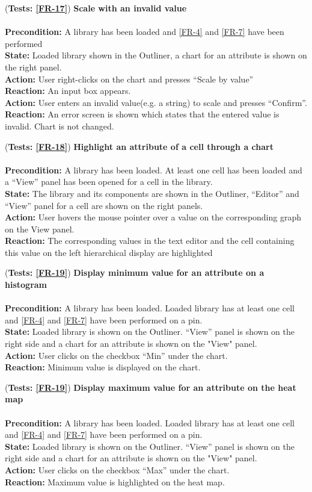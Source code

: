 \documentclass[10pt,a4paper]{report}
\newcommand{\precondition}[1]{
    \textbf{Precondition: } #1 \leavevmode \\
}
\newcommand{\action}[1]{
    \textbf{Action: } #1 \leavevmode \\
}
\newcommand{\state}[1]{
    \textbf{State: } #1 \leavevmode \\
}
\newcommand{\reaction}[1]{
    \textbf{Reaction: } #1 \leavevmode \\
}
\newcommand{\GTCDescription}[2]{
    (\textbf{Tests: #1}) \textbf{#2} \leavevmode \\
}
\begin{document}
\begin{GTC}
     \item \GTCDescription{\ref{FR-17}}
     {Scale with an invalid value} \leavevmode \\ 
        \precondition{A library has been loaded and \ref{FR-4} and \ref{FR-7} have been performed }
        \state{Loaded library shown in the Outliner, a chart for an attribute is shown on the right panel.}
        \action{User right-clicks on the chart and presses “Scale by value”}
        \reaction{An input box appears.}
        \action{User enters an invalid value(e.g. a string) to scale and presses “Confirm”.}
        \reaction{An error screen is shown which states that the entered value is invalid. Chart is not changed.}\label{GTC-41}
    
    \item \GTCDescription{\ref{FR-18}}
    {Highlight an attribute of a cell through a chart} \leavevmode \\ 
        \precondition{A library has been loaded. At least one cell has been loaded and a “View” panel has been opened for a cell in the library.}
        \state{The library and its components are shown in the Outliner, “Editor” and “View” panel for a cell are shown on the right panels.}
        \action{User hovers the mouse pointer over a value on the corresponding graph on the View panel.}
        \reaction{The corresponding values in the text editor and the cell containing this value on the left hierarchical display are highlighted}\label{GTC-42}
    
     \item \GTCDescription{\ref{FR-19}}
     {Display minimum value for an attribute on a histogram} \leavevmode \\ 
        \precondition{A library has been loaded. Loaded library has at least one cell and \ref{FR-4} and \ref{FR-7} have been performed on a pin.}
        \state{Loaded library is shown on the Outliner. “View” panel is shown on the right side and a chart for an attribute is shown on the "View" panel.}
        \action{User clicks on the checkbox “Min” under the chart.}
        \reaction{Minimum value is displayed on the chart.}\label{GTC-43}
    
    \item \GTCDescription{\ref{FR-19}}
    {Display maximum value for an attribute on the heat map } \leavevmode \\ 
        \precondition{A library has been loaded. Loaded library has at least one cell and \ref{FR-4} and \ref{FR-7} have been performed on a pin.}
        \state{Loaded library is shown on the Outliner. “View” panel is shown on the right side and a chart for an attribute is shown on the "View" panel.}
        \action{User clicks on the checkbox “Max” under the chart.}
        \reaction{Maximum value is highlighted on the heat map.}\label{GTC-44}
    

\end{GTC}
\end{document}
